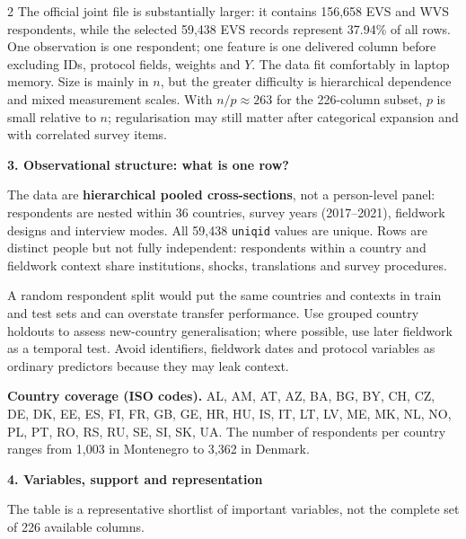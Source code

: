 \documentclass[10pt,a4paper]{article}
\newcommand{\ReportSection}[2]{%
  \vspace{3pt}%
  {\fontsize{9.5}{10.5}\selectfont\bfseries\color{Navy}#1. #2}\par
  \vspace{1pt}%
}
\begin{document}
\begin{multicols}{2}
The official joint file is substantially larger: it contains 156,658 EVS and WVS respondents, while the selected 59,438 EVS records represent 37.94\% of all rows. One observation is one respondent; one feature is one delivered column before excluding IDs, protocol fields, weights and $Y$. The data fit comfortably in laptop memory. Size is mainly in $n$, but the greater difficulty is hierarchical dependence and mixed measurement scales. With $n/p \approx 263$ for the 226-column subset, $p$ is small relative to $n$; regularisation may still matter after categorical expansion and with correlated survey items.

\ReportSection{3}{Observational structure: what is one row?}
The data are \textbf{hierarchical pooled cross-sections}, not a person-level panel: respondents are nested within 36 countries, survey years (2017--2021), fieldwork designs and interview modes. All 59,438 \texttt{uniqid} values are unique. Rows are distinct people but not fully independent: respondents within a country and fieldwork context share institutions, shocks, translations and survey procedures.

A random respondent split would put the same countries and contexts in train and test sets and can overstate transfer performance. Use grouped country holdouts to assess new-country generalisation; where possible, use later fieldwork as a temporal test. Avoid identifiers, fieldwork dates and protocol variables as ordinary predictors because they may leak context.

\textbf{Country coverage (ISO codes).} AL, AM, AT, AZ, BA, BG, BY, CH, CZ, DE, DK, EE, ES, FI, FR, GB, GE, HR, HU, IS, IT, LT, LV, ME, MK, NL, NO, PL, PT, RO, RS, RU, SE, SI, SK, UA. The number of respondents per country ranges from 1,003 in Montenegro to 3,362 in Denmark.

\columnbreak

\ReportSection{4}{Variables, support and representation}
The table is a representative shortlist of important variables, not the complete set of 226 available columns.


\end{multicols}
\end{document}
